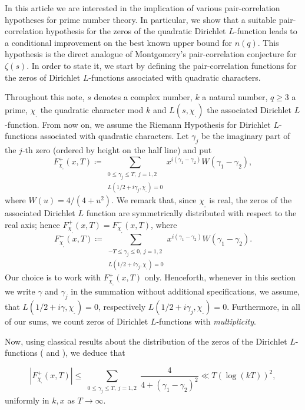 \documentclass[pdflatex]{sn-jnl}%
\theoremstyle{sltheorems}
\theoremstyle{plainrem}
\theoremstyle{definition}
\begin{document}
In this article we are interested in the implication of various pair-correlation hypotheses
for prime number theory. In particular, we show that a suitable pair-correlation 
hypothesis for the zeros of the quadratic Dirichlet $L$-function leads to a conditional improvement on the best known
upper bound for $n(q)$. This hypothesis is the direct analogue of Montgomery's pair-correlation conjecture for 
$\zeta(s)$. In order to state it, we start by defining
the pair-correlation functions for the zeros of Dirichlet $L$-functions associated with quadratic characters.

Throughout this note, $s$ denotes a complex number, $k$ a natural number, $q\ge 3$ a prime,
$\chi_{_\square}$ the quadratic character mod $k$ and $L(s, \chi_{_\square})$  the associated Dirichlet $L$-function. 
From now on, we assume the 
Riemann Hypothesis for Dirichlet $L$-functions associated with quadratic characters.
Let $\gamma_j$ be the imaginary part of the $j$-th zero (ordered by height on the half line)
and put
$$
F^+_{\chi_{_\square}}(x,T)
 \coloneq  
\sum_{\substack{0 \le  \gamma_j \le T,\ j = 1,2 \\ L(1/2+i\gamma_j, \chi_{_\square}) = 0}} 
x^{i(\gamma_1 - \gamma_2)} W(\gamma_1 - \gamma_2),
$$
where $W(u) =  4/(4+u^2)$.
We remark that, since $\chi_{_\square}$ is real, the zeros of the associated Dirichlet $L$ function 
are symmetrically distributed with respect to the real axis; hence $F^+_{\chi_{_\square}}(x,T) = F^-_{\chi_{_\square}}(x,T) $, where $$
F^-_{\chi_{_\square}}(x,T) 
 \coloneq  
\sum_{\substack{-T \le  \gamma_j \le 0,\ j = 1,2 \\ L(1/2 + i\gamma_j, \chi_{_\square}) = 0}} 
x^{i(\gamma_1 - \gamma_2)} W(\gamma_1 - \gamma_2).
$$
Our choice is to work with $F^+_{\chi_{_\square}}(x,T)$ only. Henceforth, whenever in this section we write $\gamma$ and $\gamma_j$ in the summation 
without additional specifications, we assume, that $L(1/2 + i\gamma, \chi_{_\square}) = 0$, respectively
$L(1/2 + i\gamma_j, \chi_{_\square}) = 0$.
Furthermore,  in  all of our sums, we count zeros of Dirichlet $L$-functions with \emph{multiplicity}.

Now, using classical results about the distribution of the zeros of the 
Dirichlet $L$-functions (\cite[Ch.\,16, eqn.\,1]{Davenport}  and  \cite[Ch.\,16, Lemma]{Davenport}), 
we deduce that

\begin{equation*}
    |F^+_{\chi_{_\square}}(x,T)| 
    \le
    \sum_{\substack{0 \le  \gamma_j \le T ,\ j = 1, 2 %
    }}
\frac{4}{4 + (\gamma_1 - \gamma_2)^2}
\ll T (\log (kT))^2,
\end{equation*}
uniformly in $k,x$ as $T \to \infty$.
\end{document}
